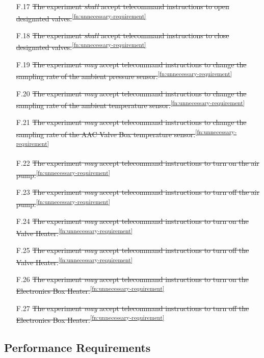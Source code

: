\documentclass[a4paper,12pt,twoside]{article}
\begin{document}
\begin{enumerate}
    \item[F.17] \st{The experiment \textit{shall} accept telecommand instructions to open designated valves.}\textsuperscript{\ref{fn:unnecessary-requirement}}
    \item[F.18] \st{The experiment \textit{shall} accept telecommand instructions to close designated valves.}\textsuperscript{\ref{fn:unnecessary-requirement}}
    \item[F.19] \st{The experiment \textit{may} accept telecommand instructions to change the sampling rate of the ambient pressure sensor.}\textsuperscript{\ref{fn:unnecessary-requirement}}
    \item[F.20] \st{The experiment \textit{may} accept telecommand instructions to change the sampling rate of the ambient temperature sensor.}\textsuperscript{\ref{fn:unnecessary-requirement}}
    \item[F.21] \st{The experiment \textit{may} accept telecommand instructions to change the sampling rate of the AAC Valve Box temperature sensor.}\textsuperscript{\ref{fn:unnecessary-requirement}}
    \item[F.22] \st{The experiment \textit{may} accept telecommand instructions to turn on the air pump.}\textsuperscript{\ref{fn:unnecessary-requirement}}
    \item[F.23] \st{The experiment \textit{may} accept telecommand instructions to turn off the air pump.}\textsuperscript{\ref{fn:unnecessary-requirement}}
    \item[F.24] \st{The experiment \textit{may} accept telecommand instructions to turn on the Valve Heater.}\textsuperscript{\ref{fn:unnecessary-requirement}}
    \item[F.25] \st{The experiment \textit{may} accept telecommand instructions to turn off the Valve Heater.}\textsuperscript{\ref{fn:unnecessary-requirement}}
    \item[F.26] \st{The experiment \textit{may} accept telecommand instructions to turn on the Electronics Box Heater.}\textsuperscript{\ref{fn:unnecessary-requirement}}
    \item[F.27] \st{The experiment \textit{may} accept telecommand instructions to turn off the Electronics Box Heater.}\textsuperscript{\ref{fn:unnecessary-requirement}}
\end{enumerate}
\pagebreak
\subsection{Performance Requirements}
\end{document}
